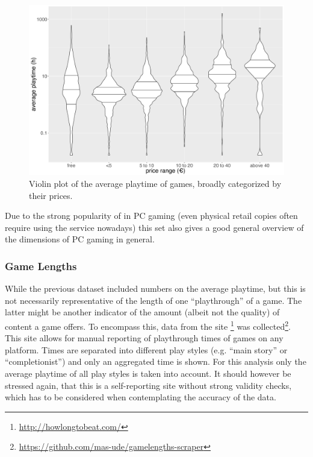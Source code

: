 

\begin{figure}[!t]
	\centering
	\includegraphics[width=1.0\columnwidth]{images/steam-cost-vs-playtime-non-sale.pdf}
	\caption{Violin plot of the average playtime of \steam games, broadly categorized by their prices.}
\label{fig:steam-cost-vs-playtime-violin}
\end{figure}



Due to the strong popularity of \steam in PC gaming (even physical retail copies often require using the service nowadays) this set also gives a good general overview of the dimensions of PC gaming in general.


\subsubsection{Game Lengths}

While the previous dataset included numbers on the average playtime, but this is not necessarily representative of the length of one ``playthrough'' of a game. The latter might be another indicator of the amount (albeit not the quality) of content a game offers. To encompass this, data from the site \hltb\footnote{\url{http://howlongtobeat.com/}} was collected\footnote{\url{https://github.com/mas-ude/gamelengths-scraper}}. This site allows for manual reporting of playthrough times of games on any platform. Times are separated into different play styles (e.g. ``main story'' or ``completionist'') and only an aggregated time is shown. For this analysis only the average playtime of all play styles is taken into account. It should however be stressed again, that this is a self-reporting site without strong validity checks, which has to be considered when contemplating the accuracy of the data.

